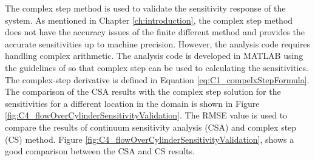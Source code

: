 The complex step method is used to validate the sensitivity response of the system. As mentioned in Chapter \ref{ch:introduction}, the complex step method does not have the accuracy issues of the finite different method and provides the accurate sensitivities up to machine precision. However, the analysis code requires handling complex arithmetic. The analysis code is developed in MATLAB using the guidelines of \cite{martins2003complex} so that complex step can be used to calculating the sensitivities. The complex-step derivative is defined in Equation \eqref{eq:C1_compelxStepFormula}. The comparison of the CSA results with the complex step solution for the sensitivities for a different location in the domain is shown in Figure \ref{fig:C4_flowOverCylinderSensitivityValidation}. The RMSE value is used to compare the results of continuum sensitivity analysis (CSA) and complex step (CS) method. Figure \ref{fig:C4_flowOverCylinderSensitivityValidation}, shows a good comparison between the CSA and CS results.

